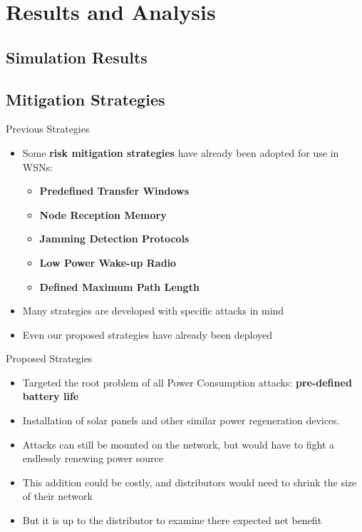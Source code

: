 \documentclass{beamer}
\begin{document}
\section{Results and Analysis}

\subsection{Simulation Results}

\subsection{Mitigation Strategies}

\begin{frame}{Previous Strategies}

\begin{itemize}

	\item Some \textbf{risk mitigation strategies} have already been adopted for use in WSNs:
	\begin{itemize}
		\item \textbf{Predefined Transfer Windows}
		\item \textbf{Node Reception Memory}
		\item \textbf{Jamming Detection Protocols}
		\item \textbf{Low Power Wake-up Radio}
		\item \textbf{Defined Maximum Path Length}
	\end{itemize}
	\item Many strategies are developed with specific attacks in mind
	\item Even our proposed strategies have already been deployed
	
\end{itemize}

\end{frame}

\begin{frame}{Proposed Strategies}

\begin{itemize}

	\item Targeted the root problem of all Power Consumption attacks: \textbf{pre-defined battery life}
	\item Installation of solar panels and other similar power regeneration devices.
	\item Attacks can still be mounted on the network, but would have to fight a endlessly renewing power source 
	\item This addition could be costly, and distributors would need to shrink the size of their network
	\item But it is up to the distributor to examine there expected net benefit
	
\end{itemize}

\end{frame}
\end{document}

